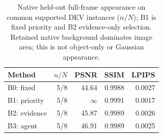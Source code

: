 \begin{table}[t]
\centering\small
\caption{Native held-out full-frame appearance on common supported DEV instances ($n/N$); B1 is fixed priority and B2 evidence-only selection. Retained native background dominates image area; this is not object-only or Gaussian appearance.}
\label{tab:native-dev-appearance}
\begin{tabular}{lrrrr}
\toprule
Method & $n/N$ & PSNR & SSIM & LPIPS \\
\midrule
B0: fixed & 5/8 & 44.64 & 0.9988 & 0.0027 \\
B1: priority & 5/8 & $\infty$ & 0.9991 & 0.0017 \\
B2: evidence & 5/8 & 45.87 & 0.9989 & 0.0026 \\
B3: agent & 5/8 & 46.91 & 0.9989 & 0.0025 \\
\bottomrule
\end{tabular}
\end{table}
